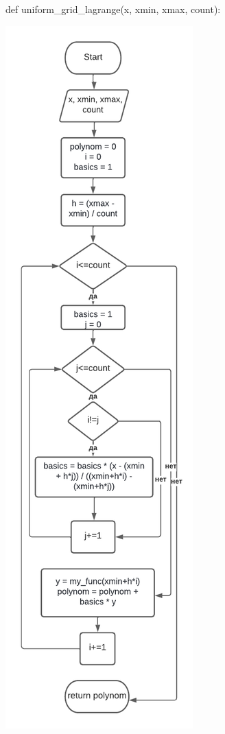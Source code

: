 def uniform\_grid\_lagrange(x, xmin, xmax, count):

\includegraphics[scale=0.75]{block3.pdf}

\bigskip

